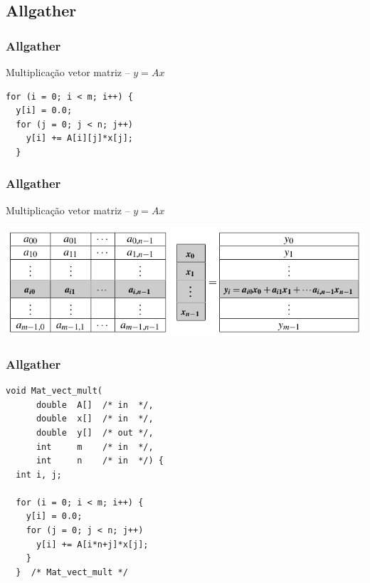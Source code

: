 \documentclass[xcolor={usenames,dvipsnames},12pt,presentation,aspectratio=169]{beamer}
\begin{document}
\subsection{Allgather}
\begin{frame}[fragile]
  \frametitle{Allgather}
  Multiplicação vetor matriz -- $y = Ax$
\begin{center}
\begin{minipage}{0.95\textwidth}
  \begin{verbatim}
for (i = 0; i < m; i++) {
  y[i] = 0.0;
  for (j = 0; j < n; j++)
    y[i] += A[i][j]*x[j];
  }
  \end{verbatim}
\end{minipage}
\end{center}
\end{frame}
\begin{frame}[fragile]
  \frametitle{Allgather}
  Multiplicação vetor matriz -- $y = Ax$
  \begin{center}
    \includegraphics[width=\textwidth]{matrix-vector.png}
    \end{center}      
\end{frame}
\begin{frame}[fragile]
  \frametitle{Allgather}
\begin{center}
\begin{minipage}{0.95\textwidth}
  \begin{verbatim}
void Mat_vect_mult(
      double  A[]  /* in  */, 
      double  x[]  /* in  */, 
      double  y[]  /* out */,
      int     m    /* in  */, 
      int     n    /* in  */) {
  int i, j;

  for (i = 0; i < m; i++) {
    y[i] = 0.0;
    for (j = 0; j < n; j++)
      y[i] += A[i*n+j]*x[j];
    }
  }  /* Mat_vect_mult */
  \end{verbatim}
\end{minipage}
\end{center}
\end{frame}
\end{document}
